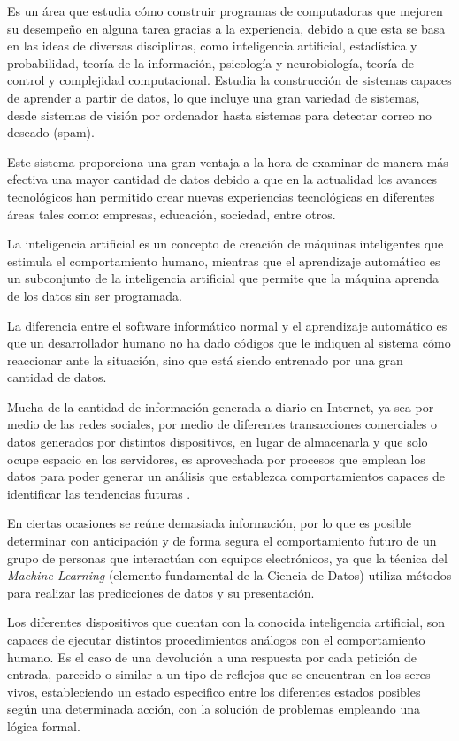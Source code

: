 Es un área que estudia cómo construir programas de computadoras que mejoren su desempeño en alguna tarea gracias a la experiencia, debido a que esta se basa en las ideas de diversas disciplinas, como inteligencia artificial, estadística y probabilidad, teoría de la información, psicología y neurobiología, teoría de control y complejidad computacional. Estudia la construcción de sistemas capaces de aprender a partir de datos, lo que incluye una gran variedad de sistemas, desde sistemas de visión por ordenador hasta sistemas para detectar correo no deseado (spam).

Este sistema proporciona una gran ventaja a la hora de examinar de manera más efectiva una mayor cantidad de datos debido a que en la actualidad los avances tecnológicos han permitido crear nuevas experiencias tecnológicas en diferentes áreas tales como: empresas, educación, sociedad, entre otros.

La inteligencia artificial es un concepto de creación de máquinas inteligentes que estimula el comportamiento humano, mientras que el aprendizaje automático es un subconjunto de la inteligencia artificial que permite que la máquina aprenda de los datos sin ser programada.

La diferencia entre el software informático normal y el aprendizaje automático es que un desarrollador humano no ha dado códigos que le indiquen al sistema cómo reaccionar ante la situación, sino que está siendo entrenado por una gran cantidad de datos.

Mucha de la cantidad de información generada a diario en Internet, ya sea por medio de las redes sociales, por medio de diferentes transacciones comerciales o datos generados por distintos dispositivos, en lugar de almacenarla y que solo ocupe espacio en los servidores, es aprovechada por procesos que emplean los datos para poder generar un análisis que establezca comportamientos capaces de identificar las tendencias futuras \cite{Sandoval2018}.

En ciertas ocasiones se reúne demasiada información, por lo que es posible determinar con anticipación y de forma segura el comportamiento futuro de un grupo de personas que interactúan con equipos electrónicos, ya que la técnica del \textit{Machine Learning} (elemento fundamental de la Ciencia de Datos) utiliza métodos para realizar las predicciones de datos y su presentación\cite{CornejoMacias2021}.

Los diferentes dispositivos que cuentan con la conocida inteligencia artificial, son capaces de ejecutar distintos procedimientos análogos con el comportamiento humano. Es el caso de una devolución a una respuesta por cada petición de entrada, parecido o similar a un tipo de reflejos que se encuentran en los seres vivos, estableciendo un estado especifico entre los diferentes estados posibles según una determinada acción, con la solución de problemas empleando una lógica formal. 

